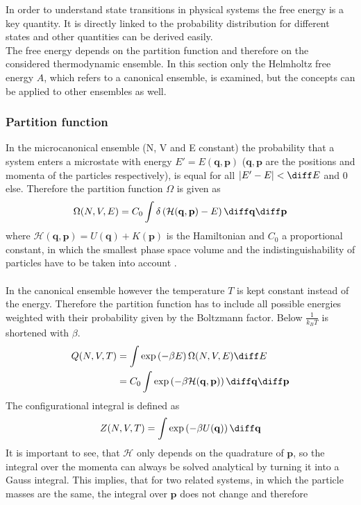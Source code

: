 In order to understand state transitions in physical systems the free energy is a key quantity. It is directly linked to the probability distribution for different states and other quantities can be derived easily.\\
The free energy depends on the partition function and therefore on the considered thermodynamic ensemble. In this section only the Helmholtz free energy $A$, which refers to a canonical ensemble, is examined, but the concepts can be applied to other ensembles as well.
\subsubsection{Partition function}
In the microcanonical ensemble (N, V and E constant) the probability that a system enters a microstate with energy $E' = E(\mathbf{q}, \mathbf{p})$ ($\mathbf{q}, \mathbf{p}$ are the positions and momenta of the particles respectively), is equal for all $\left|E' - E\right| < \diff E$ and $0$ else. Therefore the partition function $\Omega$ is given as
\begin{equation}
\label{eq:partfunc}
\Omega(N, V, E) = C_0 \int \delta\left(\mathcal{H}(\mathbf{q}, \mathbf{p}) - E\right) \diff \mathbf{q} \diff \mathbf{p}
\end{equation}
where $\mathcal{H}(\mathbf{q}, \mathbf{p}) = U(\mathbf{q}) + K(\mathbf{p})$ is the Hamiltonian and $C_0$ a proportional constant, in which the smallest phase space volume and the indistinguishability of particles have to be taken into account \autocite[16]{freeEnergyBook}.\\
\\
In the canonical ensemble however the temperature $T$ is kept constant instead of the energy. Therefore the partition function has to include all possible energies weighted with their probability given by the Boltzmann factor. Below $\frac{1}{k_B T}$ is shortened with $\beta$.
\begin{align}
Q(N, V, T) &= \int \exp\left(-\beta E\right) \Omega(N, V, E) \diff E\\
&= C_0 \int \exp\left(-{\beta\mathcal{H}(\mathbf{q}, \mathbf{p})}\right) \diff \mathbf{q} \diff \mathbf{p}
\end{align}
The configurational integral is defined as 
\begin{equation}
Z(N, V, T) = \int \exp\left(-{\beta U}(\mathbf{q})\right) \diff \mathbf{q}
\end{equation}
It is important to see, that $\mathcal{H}$ only depends on the quadrature of $\mathbf{p}$, so the integral over the momenta can always be solved analytical by turning it into a Gauss integral. This implies, that for two related systems, in which the particle masses are the same, the integral over $\mathbf{p}$ does not change and therefore
